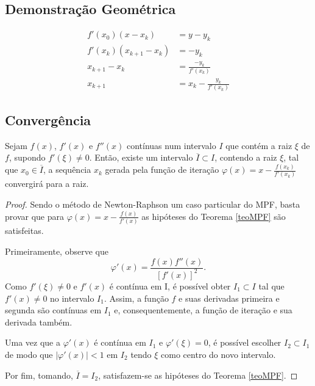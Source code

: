 \subsection{Demonstração Geométrica}
\begin{align*}
    f'(x_0)(x - x_k) &= y - y_k \\
    f'(x_k)(x_{k+1} - x_k) &= -y_k \\
    x_{k+1} - x_k &= \frac{-y_k}{f'(x_k)} \\
    x_{k+1} &= x_k - \frac{y_k}{f'(x_k)}
\end{align*}
\subsection{Convergência}
\begin{teo} \label{teoNR}
    Sejam $f(x)$, $f'(x)$ e $f''(x)$ contínuas num intervalo $I$ que contém a raiz $\xi$ de $f$, supondo $f'(\xi) \neq 0$. Então, existe um intervalo $\overline{I} \subset I$, contendo a raiz $\xi$, tal que $x_0 \in \overline{I}$, a sequência ${x_k}$ gerada pela função de iteração $\varphi(x) = x - \frac{f(x_k)}{f'(x_k)}$ convergirá para a raiz.
\end{teo}
\begin{proof}
    Sendo o método de Newton-Raphson um caso particular do MPF, basta provar que para $\varphi(x) = x - \frac{f(x)}{f'(x)}$ as hipóteses do Teorema \ref{teoMPF} são satisfeitas. 
    
    Primeiramente, observe que 
    \begin{equation} \label{dphiNR}
        \varphi'(x) = \frac{f(x)f''(x)}{[f'(x)]^2}.
    \end{equation}
    Como $f'(\xi) \neq 0$ e $f'(x)$ é contínua em I, é possível obter $I_1 \subset I$ tal que $f'(x) \neq 0$ no intervalo $I_1$. Assim, a função $f$ e suas derivadas primeira e segunda são contínuas em $I_1$ e, consequentemente, a função de iteração e sua derivada também.
    
     Uma vez que a $\varphi'(x)$ é contínua em $I_1$ e $\varphi'(\xi) = 0$, é possível escolher $I_2 \subset I_1$ de modo que $|\varphi'(x)| < 1$ em $I_2$ tendo $\xi$ como centro do novo intervalo.

    Por fim, tomando, $\overline{I} = I_2$, satisfazem-se as hipóteses do Teorema \ref{teoMPF}.
\end{proof}
